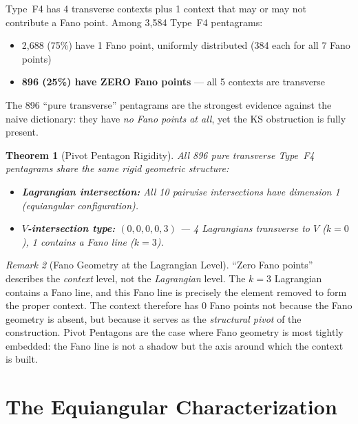 \documentclass[11pt,a4paper]{article}
\newtheorem{theorem}{Theorem}[section]
\theoremstyle{remark}
\newtheorem{remark}[theorem]{Remark}
\begin{document}
Type~F4 has 4 transverse contexts plus 1 context that may or may not
contribute a Fano point. Among 3{,}584 Type~F4 pentagrams:

\begin{itemize}
  \item 2{,}688 (75\%) have 1 Fano point, uniformly distributed
    (384 each for all 7 Fano points)
  \item \textbf{896 (25\%) have ZERO Fano points} --- all 5 contexts
    are transverse
\end{itemize}

The 896 ``pure transverse'' pentagrams are the strongest evidence
against the naive dictionary: they have \emph{no Fano points at all},
yet the KS obstruction is fully present.

\begin{theorem}[Pivot Pentagon Rigidity]
\label{thm:ghost}
All 896 pure transverse Type~F4 pentagrams share the same rigid
geometric structure:
\begin{itemize}
  \item \textbf{Lagrangian intersection:} All 10 pairwise intersections
    have dimension 1 (equiangular configuration).
  \item \textbf{$V$-intersection type:} $(0,0,0,0,3)$ --- 4 Lagrangians
    transverse to $V$ ($k=0$), 1 contains a Fano line ($k=3$).
\end{itemize}
\end{theorem}

\begin{remark}[Fano Geometry at the Lagrangian Level]
``Zero Fano points'' describes the \emph{context} level, not the
\emph{Lagrangian} level. The $k=3$ Lagrangian contains a Fano line,
and this Fano line is precisely the element removed to form the proper
context. The context therefore has 0 Fano points not because the Fano
geometry is absent, but because it serves as the \emph{structural
pivot} of the construction. Pivot Pentagons are the case where Fano
geometry is most tightly embedded: the Fano line is not a shadow but
the axis around which the context is built.
\end{remark}

\section{The Equiangular Characterization}
\label{sec:equiangular}
\end{document}
